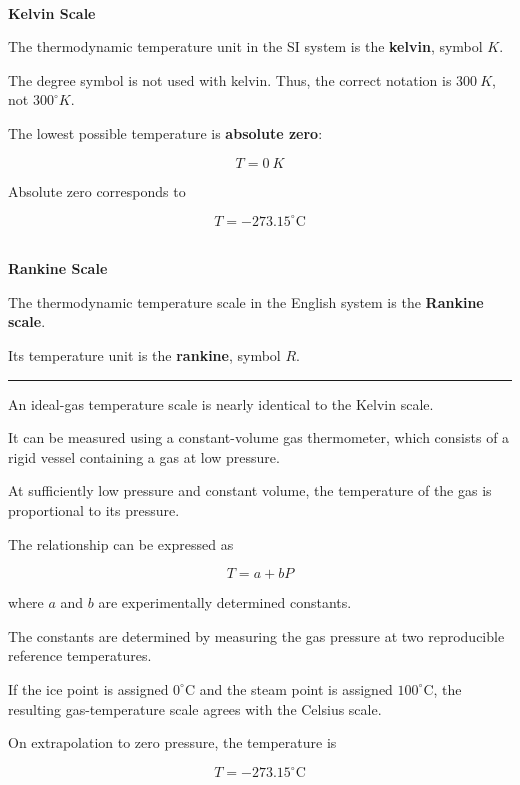 \documentclass[12pt]{article}
\newcommand{\mysubsection}[2]{%
    \noindent{\headingfont\large #1\space #2\par}
    \vspace{4pt}
    \hrule
    \vspace{15pt}
}
\begin{document}
\textbf{\\ Kelvin Scale}

The thermodynamic temperature unit in the SI system is the \textbf{kelvin}, symbol $K$.

The degree symbol is not used with kelvin. Thus, the correct notation is $300\ K$, not $300^\circ K$.

The lowest possible temperature is \textbf{absolute zero}:

\begin{equation*}
    T = 0\ K
\end{equation*}

Absolute zero corresponds to

\begin{equation*}
    T = -273.15^\circ\mathrm{C}
\end{equation*}

\textbf{\\ Rankine Scale}

The thermodynamic temperature scale in the English system is the \textbf{Rankine scale}.

Its temperature unit is the \textbf{rankine}, symbol $R$.

\mysubsection{}{Ideal-Gas Temperature Scale}

An ideal-gas temperature scale is nearly identical to the Kelvin scale.

It can be measured using a constant-volume gas thermometer, which consists of a rigid vessel containing a gas at low pressure.

At sufficiently low pressure and constant volume, the temperature of the gas is proportional to its pressure.

The relationship can be expressed as

\begin{equation*}
    T = a + bP
\end{equation*}

where $a$ and $b$ are experimentally determined constants.

The constants are determined by measuring the gas pressure at two reproducible reference temperatures.

If the ice point is assigned $0^\circ\mathrm{C}$ and the steam point is assigned $100^\circ\mathrm{C}$, the resulting gas-temperature scale agrees with the Celsius scale.

On extrapolation to zero pressure, the temperature is

\begin{equation*}
    T = -273.15^\circ\mathrm{C}
\end{equation*}
\end{document}
